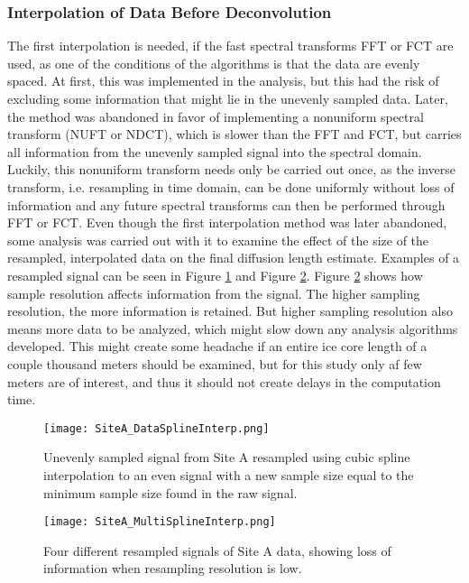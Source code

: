 \documentclass[../../CompleteThesis2/Complete_2ndDraft]{subfiles}
\begin{document}
\subsubsection[Interpolation 1]{Interpolation of Data Before Deconvolution}
\label{Subsubsec:CompMethod_StabilityTests_Interpolation1}

The first interpolation is needed, if the fast spectral transforms FFT or FCT are used, as one of the conditions of the algorithms is that the data are evenly spaced. At first, this was implemented in the analysis, but this had the risk of excluding some information that might lie in the unevenly sampled data. Later, the method was abandoned in favor of implementing a nonuniform spectral transform (NUFT or NDCT), which is slower than the FFT and FCT, but carries all information from the unevenly sampled signal into the spectral domain. Luckily, this nonuniform transform needs only be carried out once, as the inverse transform, i.e. resampling in time domain, can be done uniformly without loss of information and any future spectral transforms can then be performed through FFT or FCT.
Even though the first interpolation method was later abandoned, some analysis was carried out with it to examine the effect of the size of the resampled, interpolated data on the final diffusion length estimate. Examples of a resampled signal can be seen in Figure \ref{Fig:COMPMETH_SiteA_DataSplineInterp} and Figure \ref{Fig:COMPMETH_SiteA_MultiSplineInterp}. Figure \ref{Fig:COMPMETH_SiteA_MultiSplineInterp} shows how sample resolution affects information from the signal. The higher sampling resolution, the more information is retained. But higher sampling resolution also means more data to be analyzed, which might slow down any analysis algorithms developed. This might create some headache if an entire ice core length of a couple thousand meters should be examined, but for this study only af few meters are of interest, and thus it should not create delays in the computation time.

\begin{figure}[h]
	\centering
	\texttt{[image: SiteA\_DataSplineInterp.png]}
	\caption{Unevenly sampled signal from Site A resampled using cubic spline interpolation to an even signal with a new sample size equal to the minimum sample size found in the raw signal.}
	\label{Fig:COMPMETH_SiteA_DataSplineInterp}
\end{figure}

\begin{figure}[h]
	\centering
	\texttt{[image: SiteA\_MultiSplineInterp.png]}
	\caption{Four different resampled signals of Site A data, showing loss of information when resampling resolution is low.}
	\label{Fig:COMPMETH_SiteA_MultiSplineInterp}
\end{figure}
\end{document}
